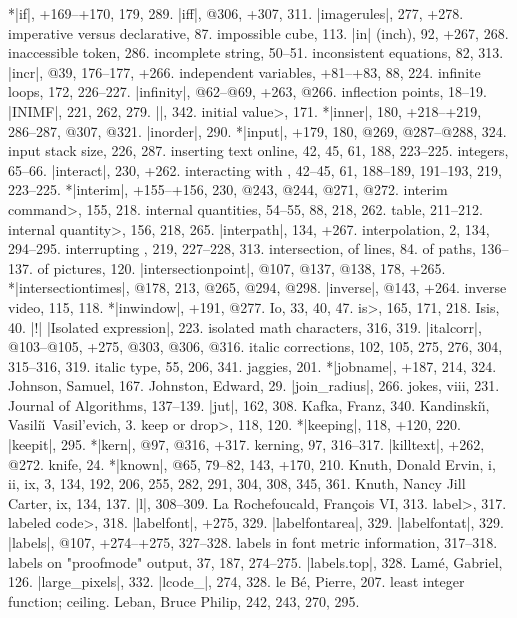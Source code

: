 *|if|, +169--+170, 179, 289.
|iff|, @306, +307, 311.
|imagerules|, 277, +278.
imperative versus declarative, 87.
impossible cube, 113.
|in| (inch), 92, +267, 268.
inaccessible token, 286.
incomplete string, 50--51.
inconsistent equations, 82, 313.
|incr|, @39, 176--177, +266.
independent variables, +81--+83, 88, 224.
infinite loops, 172, 226--227.
|infinity|, @62--@69, +263, @266.
inflection points, 18--19.
|INIMF|, 221, 262, 279.
|\init|, 342.
\<initial value>, 171.
*|inner|, 180, +218--+219, 286--287, @307, @321.
|inorder|, 290.
*|input|, +179, 180, @269, @287--@288, 324.
input stack size, 226, 287.
inserting text online, 42, 45, 61, 188, 223--225.
integers, 65--66.
|interact|, 230, +262.
interacting with \MF, 42--45, 61, 188--189, 191--193, 219, 223--225.
*|interim|, +155--+156, 230, @243, @244, @271, @272.
\<interim command>, 155, 218.
internal quantities, 54--55, 88, 218, 262.
\sub table, 211--212.
\<internal quantity>, 156, 218, 265.
|interpath|, 134, +267.
interpolation, 2, 134, 294--295.
interrupting \MF, 219, 227--228, 313.
intersection, of lines, 84.
\sub of paths, 136--137.
\sub of pictures, 120.
|intersectionpoint|, @107, @137, @138, 178, +265.
*|intersectiontimes|, @178, 213, @265, @294, @298.
|inverse|, @143, +264.
inverse video, 115, 118.
*|inwindow|, +191, @277.
Io, 33, 40, 47.
\<is>, 165, 171, 218.
Isis, 40.
|!| |Isolated expression|, 223.
isolated math characters, 316, 319.
|italcorr|, @103--@105, +275, @303, @306, @316.
italic corrections, 102, 105, 275, 276, 304, 315--316, 319.
italic type, 55, 206, 341.
\newletter
jaggies, 201.
*|jobname|, +187, 214, 324.
Johnson, Samuel, 167.
Johnston, Edward, 29.
|join_radius|, 266.
jokes, viii, 231.
Journal of Algorithms, 137--139.
|jut|, 162, 308.
\newletter
Kafka, Franz, 340.
Kandinski\u\i, Vasili\u\i\ Vasil'evich, 3.
\<keep or drop>, 118, 120.
*|keeping|, 118, +120, 220.
|keepit|, 295.
*|kern|, @97, @316, +317.
kerning, 97, 316--317.
|killtext|, +262, @272.
knife, 24.
*|known|, @65, 79--82, 143, +170, 210.
Knuth, Donald Ervin, i, ii, ix, 3, 134, 192, 206, 255, 282, 291, 304, 308, 345,
 361.
Knuth, Nancy Jill Carter, ix, 134, 137.
\newletter
|l|, 308--309.
La Rochefoucald, Fran\c cois VI, 313.
\<label>, 317.
\<labeled code>, 318.
|labelfont|, +275, 329.
|labelfontarea|, 329.
|labelfontat|, 329.
|labels|, @107, +274--+275, 327--328.
labels in font metric information, 317--318.
labels on "proofmode" output, 37, 187, 274--275.
|labels.top|, 328.
Lam\'e, Gabriel, 126.
|large_pixels|, 332.
|lcode_|, 274, 328.
le B\'e, Pierre, 207.
least integer function; \see ceiling.
Leban, Bruce Philip, 242, 243, 270, 295.
